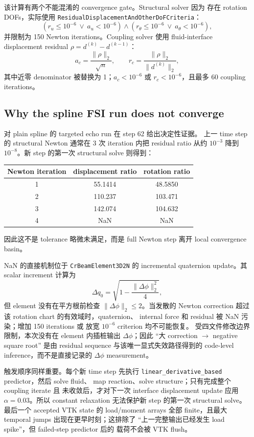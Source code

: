 \documentclass[11pt,a4paper]{article}
\begin{document}
该计算有两个不能混淆的 convergence gate。Structural solver 因为
存在 rotation DOFs，实际使用
\texttt{ResidualDisplacementAndOtherDoFCriteria}：
\[
 \left(r_u\le10^{-6}\ \lor\ a_u<10^{-6}\right)
 \land
 \left(r_\theta\le10^{-6}\ \lor\ a_\theta<10^{-6}\right),
\]
并限制为 150 Newton iterations。Coupling solver 使用 fluid-interface
displacement residual $\rho=d^{(k)}-d^{(k-1)}$：
\[
 a_c=\frac{\|\rho\|_2}{\sqrt{n}},\qquad
 r_c=\frac{\|\rho\|_2}{\|d^{(k)}\|_2},
\]
其中近零 denominator 被替换为 1；$a_c<10^{-6}$ 或
$r_c<10^{-6}$，且最多 60 coupling iterations。

\subsection{Why the spline FSI run does not converge}

对 plain spline 的 targeted echo run 在 step 62 给出决定性证据。
上一 time step 的 structural Newton 通常在 3 次 iteration 内把
residual ratio 从约 $10^{-3}$ 降到 $10^{-8}$。新 step 的第一次
structural solve 则得到：
\begin{center}
\begin{tabular}{ccc}
\toprule
Newton iteration & displacement ratio & rotation ratio\\
\midrule
1 & 55.1414 & 48.5850\\
2 & 110.237 & 103.471\\
3 & 142.074 & 104.632\\
4 & NaN & NaN\\
\bottomrule
\end{tabular}
\end{center}
因此这不是 tolerance 略微未满足，而是 full Newton step 离开
local convergence basin。

NaN 的直接机制位于 \texttt{CrBeamElement3D2N} 的 incremental
quaternion update。其 scalar increment 计算为
\[
 \Delta q_0=\sqrt{1-\frac{\|\Delta\phi\|_2^2}{4}},
\]
但 element 没有在平方根前检查 $\|\Delta\phi\|_2\le2$。当发散的
Newton correction 超过该 rotation chart 的有效域时，quaternion、
internal force 和 residual 被 NaN 污染；增加 150 iterations 或
放宽 $10^{-6}$ criterion 均不可能恢复。
受四文件修改边界限制，本次没有在 element 内插桩输出
$\Delta\phi$；因此 ``大 correction $\rightarrow$ negative square
root'' 是由 residual sequence 与该唯一显式失效路径得到的
code-level inference，而不是直接记录的 $\Delta\phi$ measurement。

触发顺序同样重要。每个新 time step 先执行
\texttt{linear\_derivative\_based} predictor，然后 solve fluid、
map reaction、solve structure；只有完成整个 coupling iterate 且
未收敛后，才对下一次 interface displacement update 应用
$\alpha=0.03$。所以 constant relaxation 无法保护新 step 的第一次
structural solve。最后一个 accepted VTK state 的 load/moment arrays
全部 finite，且最大 temporal jumps 出现在更早时刻；这排除了
``上一完整输出已经发生 load spike''，但 failed-step predictor 后的
载荷不会被 VTK flush。
\end{document}
